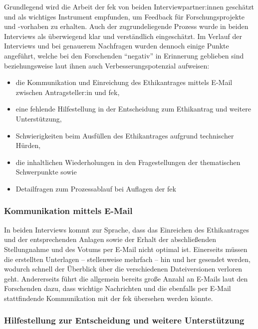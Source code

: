 \documentclass[a4paper,12pt,twoside]{scrreprt}
\begin{document}
Grundlegend wird die Arbeit der \ac{fek} von beiden Interviewpartner:innen geschätzt und als wichtiges Instrument empfunden, um Feedback für Forschungsprojekte und -vorhaben zu erhalten. Auch der zugrundeliegende Prozess wurde in beiden Interviews als überwiegend klar und verständlich eingeschätzt. Im Verlauf der Interviews und bei genauerem Nachfragen wurden dennoch einige Punkte angeführt, welche bei den Forschenden \enquote{negativ} in Erinnerung geblieben sind beziehungsweise laut ihnen auch Verbesserungspotenzial aufweisen:
\begin{itemize}
    \item die Kommunikation und Einreichung des Ethikantrages mittels E-Mail zwischen Antragsteller:in und \ac{fek},
    \item eine fehlende Hilfestellung in der Entscheidung zum Ethikantrag und weitere Unterstützung,
    \item Schwierigkeiten beim Ausfüllen des Ethikantrages aufgrund technischer Hürden,
    \item die inhaltlichen Wiederholungen in den Fragestellungen der thematischen Schwerpunkte sowie
    \item Detailfragen zum Prozessablauf bei Auflagen der \ac{fek}
\end{itemize}

\subsubsection*{Kommunikation mittels E-Mail}
\label{sub-sub-sec:kommunikation-email}

In beiden Interviews kommt zur Sprache, dass das Einreichen des Ethikantrages und der entsprechenden Anlagen sowie der Erhalt der abschließenden Stellungnahme und des Votums per E-Mail nicht optimal ist. Einerseits müssen die erstellten Unterlagen -- stellenweise mehrfach -- hin und her gesendet werden, wodurch schnell der Überblick über die verschiedenen Dateiversionen verloren geht. Andererseits führt die allgemein bereits große Anzahl an E-Mails laut den Forschenden dazu, dass wichtige Nachrichten und die ebenfalls per E-Mail stattfindende Kommunikation mit der \ac{fek} übersehen werden könnte.

\subsubsection*{Hilfestellung zur Entscheidung und weitere Unterstützung}
\label{sub-sub-sec:hilfestellung-unterstützung}
\end{document}
